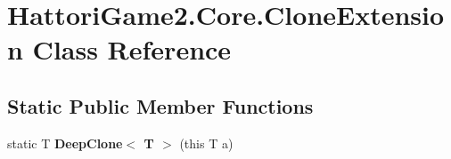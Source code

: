 \hypertarget{class_hattori_game2_1_1_core_1_1_clone_extension}{}\section{Hattori\+Game2.\+Core.\+Clone\+Extension Class Reference}
\label{class_hattori_game2_1_1_core_1_1_clone_extension}
\subsection*{Static Public Member Functions}
\begin{DoxyCompactItemize}
\item 
\hypertarget{class_hattori_game2_1_1_core_1_1_clone_extension_ac06b32b586af146edf9fd744f485b16a}{}static T {\bfseries Deep\+Clone$<$ T $>$} (this T a)\label{class_hattori_game2_1_1_core_1_1_clone_extension_ac06b32b586af146edf9fd744f485b16a}

\end{DoxyCompactItemize}
